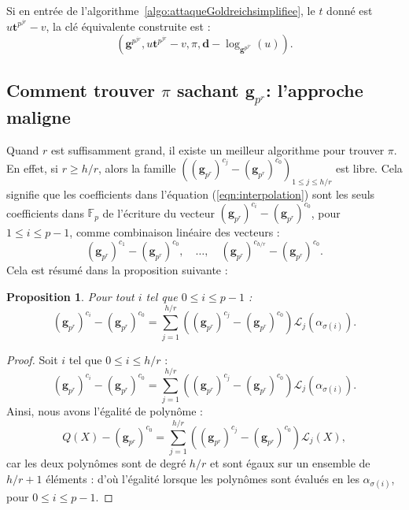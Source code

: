 \documentclass[a4paper, titlepage, 11pt]{article}
\newtheorem{prop}[theo]{Proposition}
\theoremstyle{definition}
\theoremstyle{remark}
\def\gf #1{\mathbb{F}_{#1}}
\def\mbf #1{\mathbf{#1}}
\begin{document}
Si en entrée de l'algorithme~\ref{algo:attaqueGoldreichsimplifiee}, le $t$ donné est $u \mbf t^{p^{jr}} -v$, la clé équivalente construite est : $$(\mbf g^{p^{jr}}, u \mbf t^{p^{jr}} -v, \pi, \mbf d - \log_{\mbf g^{p^{jr}}}(u)).$$

\subsection{Comment trouver $\pi$ sachant $\mbf g_{p^r}$: l'approche maligne}

Quand $r$ est suffisamment grand, il existe un meilleur algorithme pour trouver $\pi$. En effet, si $r \geqslant h/r$, alors la famille $\left((\mbf g_{p^r})^{c_{j}} - (\mbf g_{p^r})^{c_{0}} \right)_{1\leqslant j \leqslant h/r}$ est libre. 
Cela signifie que les coefficients dans l'équation (\ref{eqn:interpolation}) sont les seuls coefficients dans $\gf{p}$ de l'écriture du vecteur $(\mbf g_{p^r})^{c_{i}} - (\mbf g_{p^r})^{c_{0}}$, pour $1\leqslant i \leqslant p-1$, comme combinaison linéaire des vecteurs : $$(\mbf g_{p^r})^{c_{1}} - (\mbf g_{p^r})^{c_{0}},\quad \dots,\quad (\mbf g_{p^r})^{c_{{h/r}}} - (\mbf g_{p^r})^{c_{0}}.$$
Cela est résumé dans la proposition suivante :

\begin{prop}Pour tout $i$ tel que $0\leqslant i \leqslant p-1$ :
\begin{equation}\label{eqn:combLineaire}
(\mbf g_{p^r})^{c_i} - (\mbf g_{p^r})^{c_{0}} = \sum_{j=1}^{h/r} \left((\mbf g_{p^r})^{c_{j}} - (\mbf g_{p^r})^{c_{0}} \right)\mathcal L_j(\alpha_{\sigma(i)}).
\end{equation}
\end{prop}

\begin{proof}
Soit $i$ tel que $0 \leqslant i \leqslant {h/r}$ :
$$(\mbf g_{p^r})^{c_i} - (\mbf g_{p^r})^{c_{0}} = \sum_{j=1}^{h/r} \left((\mbf g_{p^r})^{c_{j}} - (\mbf g_{p^r})^{c_{0}} \right)\mathcal L_j(\alpha_{\sigma(i)}).$$
Ainsi, nous avons l'égalité de polynôme :
$$Q(X) - (\mbf g_{p^r})^{c_{0}} = \sum_{j=1}^{h/r} \left((\mbf g_{p^r})^{c_{j}} - (\mbf g_{p^r})^{c_{0}} \right)\mathcal L_j(X),$$
car les deux polynômes sont de degré $h/r$ et sont égaux sur un ensemble de $h/r + 1$ éléments : d'où l'égalité lorsque les polynômes sont évalués en les $\alpha_{\sigma(i)}$, pour $0\leqslant i \leqslant p-1$.\end{proof}
\end{document}
